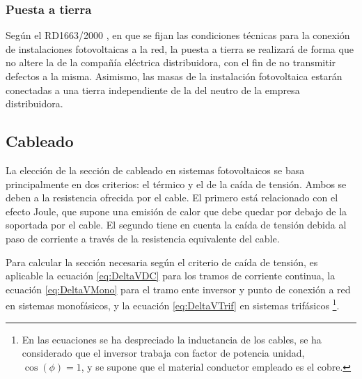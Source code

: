 \subsubsection{Puesta a tierra}

Según el RD1663/2000 \cite{RealDecreto2000}, en que se fijan las
condiciones técnicas para la conexión de instalaciones fotovoltaicas
a la red, la puesta a tierra se realizará de forma que no altere la
de la compañía eléctrica distribuidora, con el fin de no transmitir
defectos a la misma. Asimismo, las masas de la instalación fotovoltaica
estarán conectadas a una tierra independiente de la del neutro de
la empresa distribuidora.


\subsection{Cableado}

La elección de la sección de cableado en sistemas fotovoltaicos se
basa principalmente en dos criterios: el térmico y el de la caída de
tensión. Ambos se deben a la resistencia ofrecida por el cable.  El
primero está relacionado con el efecto Joule, que supone una emisión
de calor que debe quedar por debajo de la soportada por el cable.  El
segundo tiene en cuenta la caída de tensión debida al paso de
corriente a través de la resistencia equivalente del cable.

Para calcular la sección necesaria según el criterio de caída de
tensión, es aplicable la ecuación \ref{eq:DeltaVDC} para los tramos de
corriente continua, la ecuación \ref{eq:DeltaVMono} para el tramo ente
inversor y punto de conexión a red en sistemas monofásicos, y la
ecuación \ref{eq:DeltaVTrif} en sistemas trifásicos%
\footnote{En las ecuaciones se ha despreciado la inductancia de los
  cables, se ha considerado que el inversor trabaja con factor de
  potencia unidad,
  $\cos(\phi)=1$, y se supone que el material
  conductor empleado es el cobre. %
}.

